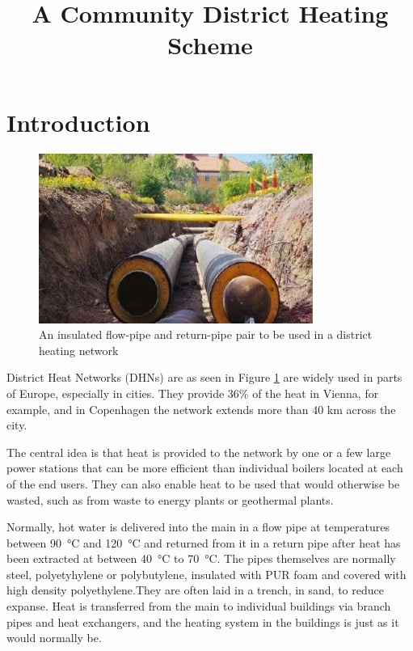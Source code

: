 \documentclass[parskip=half]{scrartcl}
\title{A Community District Heating Scheme}
\author{}
\date{}
\begin{document}
\maketitle
\section{Introduction}

\begin{figure}[ht]\label{fig1}
\centering
\includegraphics[width=0.8\textwidth]{HeatMain.jpg}
\caption{An insulated  flow-pipe and return-pipe pair to be used in a district heating network}
\end{figure}
    
District Heat Networks (DHNs) are as seen in Figure \ref{fig1} are widely used in parts of Europe, especially in cities. They provide 36\% of the heat in Vienna, for example, and in Copenhagen the network extends more than 40 km across the city. 

The central idea is that heat is provided to the network by one or a few large power stations that can be more efficient than individual boilers located at each of the end users. They can also enable heat to be used that would otherwise be wasted, such as from waste to energy plants or geothermal plants.

Normally, hot water is delivered into the main in a flow pipe at temperatures between \SI{90}{\celsius} and \SI{120}{\celsius} and returned from it in a return pipe after heat has been extracted at between \SI{40}{\celsius} to \SI{70}{\celsius}. The pipes themselves are normally steel, polyetyhylene or polybutylene, insulated with PUR foam and covered with high density polyethylene.They are often laid in a trench, in sand, to reduce expanse. Heat is transferred from the main to individual buildings via branch pipes and heat exchangers, and the heating system in the buildings is just as it would normally be.
\end{document}
